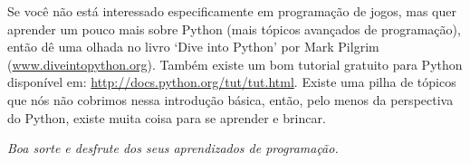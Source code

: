 Se você não está interessado especificamente em programação de jogos, mas quer aprender um pouco mais sobre Python (mais tópicos avançados de programação), então dê uma olhada no livro `Dive into Python' por Mark Pilgrim (\href{http://www.diveintopython.org}{www.diveintopython.org}). Também existe um bom tutorial gratuito para Python disponível em: \href{http://docs.python.org/tut/tut.html}{http://docs.python.org/tut/tut.html}. Existe uma pilha de tópicos que nós não cobrimos nessa introdução básica, então, pelo menos da perspectiva do Python, existe muita coisa para se aprender e brincar.
\par\par\noindent
\emph{Boa sorte e desfrute dos seus aprendizados de programação.}

\newpage
